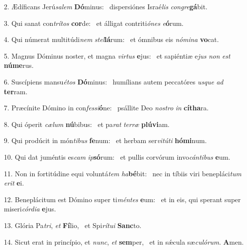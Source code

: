 2. Ædíficans Jerú\textit{sa}\textit{lem} \textbf{Dó}minus: \ast\  dispersiónes Israé\textit{lis} \textit{con}\textit{gre}\textbf{gá}bit.\

3. Qui sanat con\textit{trí}\textit{tos} \textbf{cor}de: \ast\  et álligat contriti\textit{ó}\textit{nes} \textit{e}\textbf{ó}rum.\

4. Qui númerat multitúdi\textit{nem} \textit{stel}\textbf{lá}rum: \ast\  et ómnibus eis \textit{nó}\textit{mi}\textit{na} \textbf{vo}cat.\

5. Magnus Dóminus noster, et magna \textit{vir}\textit{tus} \textbf{e}jus: \ast\  et sapiéntiæ e\textit{jus} \textit{non} \textit{est} \textbf{nú}\textbf{me}rus.\

6. Suscípiens mansu\textit{é}\textit{tos} \textbf{Dó}minus: \ast\  humílians autem peccatóres \textit{us}\textit{que} \textit{ad} \textbf{ter}ram.\

7. Præcínite Dómino in con\textit{fes}\textit{si}\textbf{ó}ne: \ast\  psállite Deo \textit{nos}\textit{tro} \textit{in} \textbf{cí}\textbf{tha}ra.\

8. Qui óperit \textit{cæ}\textit{lum} \textbf{nú}bibus: \ast\  et pa\textit{rat} \textit{ter}\textit{ræ} \textbf{plú}\textbf{vi}am.\

9. Qui prodúcit in món\textit{ti}\textit{bus} \textbf{fe}num: \ast\  et herbam ser\textit{vi}\textit{tú}\textit{ti} \textbf{hó}\textbf{mi}num.\

10. Qui dat juméntis es\textit{cam} \textit{ip}\textbf{só}rum: \ast\  et pullis corvórum invo\textit{cán}\textit{ti}\textit{bus} \textbf{e}um.\

11. Non in fortitúdine equi voluntá\textit{tem} \textit{ha}\textbf{bé}bit: \ast\  nec in tíbiis viri benepláci\textit{tum} \textit{e}\textit{rit} \textbf{e}i.\

12. Beneplácitum est Dómino super ti\textit{mén}\textit{tes} \textbf{e}um: \ast\  et in eis, qui sperant super miseri\textit{cór}\textit{di}\textit{a} \textbf{e}jus.\

13. Glória Pa\textit{tri}, \textit{et} \textbf{Fí}lio, \ast\  et Spi\textit{rí}\textit{tu}\textit{i} \textbf{Sanc}to.\

14. Sicut erat in princípio, et \textit{nunc}, \textit{et} \textbf{sem}per, \ast\  et in sǽcula sæ\textit{cu}\textit{ló}\textit{rum}. \textbf{A}men.\


